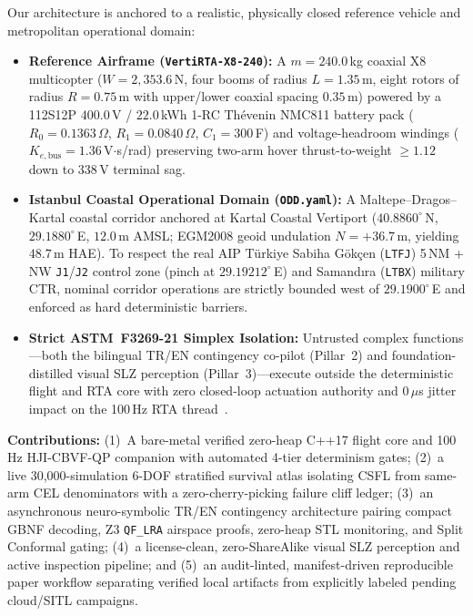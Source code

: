 \documentclass[conference,10pt]{IEEEtran}
\begin{document}
Our architecture is anchored to a realistic, physically closed reference vehicle and metropolitan operational domain:
\begin{itemize}
  \item \textbf{Reference Airframe (\texttt{VertiRTA-X8-240}):} A $m=240.0$\,kg coaxial X8 multicopter ($W=2{,}353.6$\,N, four booms of radius $L=1.35$\,m, eight rotors of radius $R=0.75$\,m with upper/lower coaxial spacing $0.35$\,m) powered by a 112S12P $400.0$\,V / $22.0$\,kWh 1-RC Th\'evenin NMC811 battery pack ($R_0=0.1363\,\Omega$, $R_1=0.0840\,\Omega$, $C_1=300$\,F) and voltage-headroom windings ($K_{e,\text{bus}}=1.36$\,V$\cdot$s/rad) preserving two-arm hover thrust-to-weight $\ge 1.12$ down to $338$\,V terminal sag.
  \item \textbf{Istanbul Coastal Operational Domain (\texttt{ODD.yaml}):} A Maltepe--Dragos--Kartal coastal corridor anchored at Kartal Coastal Vertiport ($40.8860^\circ$\,N, $29.1880^\circ$\,E, $12.0$\,m AMSL; EGM2008 geoid undulation $N=+36.7$\,m, yielding $48.7$\,m HAE). To respect the real AIP T\"urkiye Sabiha G\"ok\c{c}en (\texttt{LTFJ}) 5\,NM + NW \texttt{J1}/\texttt{J2} control zone (pinch at $29.19212^\circ$\,E) and Samand\i ra (\texttt{LTBX}) military CTR, nominal corridor operations are strictly bounded west of $29.1900^\circ$\,E and enforced as hard deterministic barriers.
  \item \textbf{Strict ASTM~F3269-21 Simplex Isolation:} Untrusted complex functions---both the bilingual TR/EN contingency co-pilot (Pillar~2) and foundation-distilled visual SLZ perception (Pillar~3)---execute outside the deterministic flight and RTA core with zero closed-loop actuation authority and $0\,\mu$s jitter impact on the 100\,Hz RTA thread~\cite{astm_f3269_2021}.
\end{itemize}

\textbf{Contributions:} (1)~A bare-metal verified zero-heap C++17 flight core and 100\,Hz HJI-CBVF-QP companion with automated 4-tier determinism gates; (2)~a live 30{,}000-simulation 6-DOF stratified survival atlas isolating CSFL from same-arm CEL denominators with a zero-cherry-picking failure cliff ledger; (3)~an asynchronous neuro-symbolic TR/EN contingency architecture pairing compact GBNF decoding, Z3 \texttt{QF\_LRA} airspace proofs, zero-heap STL monitoring, and Split Conformal gating; (4)~a license-clean, zero-ShareAlike visual SLZ perception and active inspection pipeline; and (5)~an audit-linted, manifest-driven reproducible paper workflow separating verified local artifacts from explicitly labeled pending cloud/SITL campaigns.
\end{document}
